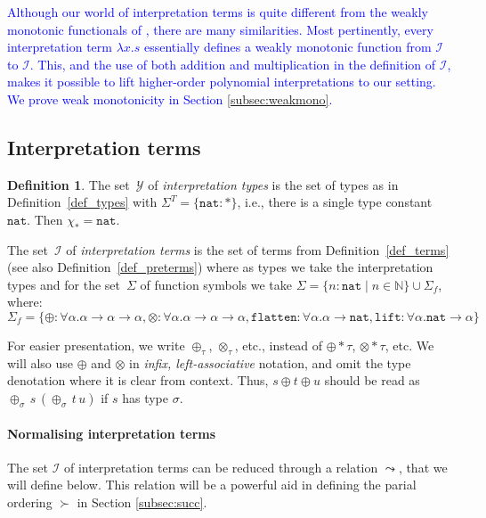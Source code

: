 \documentclass[a4paper,UKenglish,cleveref,autoref,numberwithinsect]{lipics-v2019}
\theoremstyle{definition}
\newtheorem{defn}[theorem]{Definition}
\newcommand{\Iterms}{\mathcal{I}}
\newcommand{\ITypes}{\mathcal{Y}}
\newcommand{\arrtype}{\rightarrow}
\newcommand{\tapp}[2]{#1 * #2}
\newcommand{\abs}[2]{\lambda #1.#2}
\newcommand{\arrW}{\leadsto}
\newcommand{\nat}{\mathtt{nat}}
\newcommand{\flatten}{\mathtt{flatten}}
\newcommand{\lift}{\mathtt{lift}}
\newcommand{\Nbb}{\mathbb{N}}
\newcommand{\CKchange}[1]{\textcolor{blue}{#1}}
\begin{document}
\CKchange{Although our world of interpretation terms is quite different
from the weakly monotonic functionals of \cite{pol:96}, there are many
similarities.  Most pertinently, every interpretation term $\abs{x}{s}$
essentially defines a weakly monotonic function from $\Iterms$ to
$\Iterms$.  This, and the use of both addition and multiplication in
the definition of $\Iterms$, makes it possible to lift higher-order
polynomial interpretations \cite{FuhsKop2012} to our setting.  We %
prove weak monotonicity in Section \ref{subsec:weakmono}.}

\subsection{Interpretation terms}\label{subsec:I}

\begin{defn}\label{def_iterms}
  The set~$\ITypes$ of \emph{interpretation types} is the set of types
  as in Definition~\ref{def_types} with $\Sigma^T = \{ \nat : * \}$,
  i.e., there is a single type constant~$\nat$. Then $\chi_* = \nat$.

  The set~$\Iterms$ of \emph{interpretation terms} is the set of terms
  from Definition~\ref{def_terms} (see also
  Definition~\ref{def_preterms}) where as types we take the
  interpretation types and for the set~$\Sigma$ of function symbols we
  take $\Sigma = \{ n : \nat \mid n \in \Nbb \} \cup \Sigma_f$, where:
  \[
      \Sigma_f = \{ \oplus : \forall \alpha . \alpha \arrtype
                 \alpha \arrtype \alpha, \otimes : \forall \alpha . \alpha \arrtype \alpha
                 \arrtype \alpha, \flatten : \forall \alpha . \alpha \arrtype
                 \nat, \lift : \forall \alpha . \nat \arrtype \alpha
                 \}
  \]
\end{defn}

For easier presentation, we write $\oplus_\tau$, $\otimes_\tau$, etc.,
instead of $\tapp{\oplus}{\tau}$, $\tapp{\otimes}{\tau}$, etc. We will
also use $\oplus$ and $\otimes$ in \emph{infix, left-associative}
notation, and omit the type denotation where it is clear from
context. Thus, $s \oplus t \oplus u$ should be read as
$\oplus_\sigma\,s\,(\oplus_\sigma\,t\,u)$ if $s$ has type $\sigma$.

\paragraph*{Normalising interpretation terms}

The set $\Iterms$ of interpretation terms can be reduced through
a relation $\arrW$, that we will define below.  This relation will
be a powerful aid in defining the parial ordering $\succ$ in Section
\ref{subsec:succ}.
\end{document}
